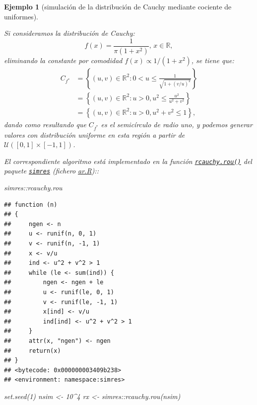 \documentclass[
]{book}
\newenvironment{Shaded}{\begin{snugshade}}{\end{snugshade}}
\newcommand{\DecValTok}[1]{\textcolor[rgb]{0.00,0.00,0.81}{#1}}
\newcommand{\FunctionTok}[1]{\textcolor[rgb]{0.00,0.00,0.00}{#1}}
\newcommand{\NormalTok}[1]{#1}
\newcommand{\OtherTok}[1]{\textcolor[rgb]{0.56,0.35,0.01}{#1}}
\newcommand{\SpecialCharTok}[1]{\textcolor[rgb]{0.00,0.00,0.00}{#1}}
\theoremstyle{break}
\newtheorem{example}{Ejemplo}[chapter]
\theoremstyle{nonumberplain}
\begin{document}
\begin{example}[simulación de la distribución de Cauchy mediante cociente de uniformes]
\protect\hypertarget{exm:cauchy-rou}{}\label{exm:cauchy-rou}

Si consideramos la distribución de Cauchy:
\[f(x) = \frac{1}{\pi (1 + x^2)} \text{, } x\in \mathbb{R},\]
eliminando la constante por comodidad \(f(x) \propto 1/(1 + x^2)\), se tiene que:
\[\begin{aligned}
C_{f^{\ast}} & = \left\{ (u, v) \in \mathbb{R}^{2} : 0 <u \leq \frac{1}{\sqrt{1 + (v/u)^2}}  \right\} \\
& = \left\{ (u, v) \in \mathbb{R}^{2} : u > 0, u^2 \leq \frac{u^2}{u^2 + v^2}  \right\} \\
& = \left\{ (u, v) \in \mathbb{R}^{2} : u > 0, u^2 + v^2 \leq 1  \right\}, 
\end{aligned}\]
dando como resultando que \(C_{f^{\ast}}\) es el semicírculo de radio uno, y podemos generar valores con distribución uniforme en esta región a partir de \(\mathcal{U}\left([0,1]\times[-1,1] \right)\).

El correspondiente algoritmo está implementado en la función \href{https://rubenfcasal.github.io/simres/reference/rcauchy.rou.html}{\texttt{rcauchy.rou()}} del paquete \href{https://rubenfcasal.github.io/simres}{\texttt{simres}} (fichero \href{R/ar.R}{\emph{ar.R}})::

\begin{Shaded}
\begin{Highlighting}[]
\NormalTok{simres}\SpecialCharTok{::}\NormalTok{rcauchy.rou}
\end{Highlighting}
\end{Shaded}

\begin{verbatim}
## function (n) 
## {
##     ngen <- n
##     u <- runif(n, 0, 1)
##     v <- runif(n, -1, 1)
##     x <- v/u
##     ind <- u^2 + v^2 > 1
##     while (le <- sum(ind)) {
##         ngen <- ngen + le
##         u <- runif(le, 0, 1)
##         v <- runif(le, -1, 1)
##         x[ind] <- v/u
##         ind[ind] <- u^2 + v^2 > 1
##     }
##     attr(x, "ngen") <- ngen
##     return(x)
## }
## <bytecode: 0x000000003409b238>
## <environment: namespace:simres>
\end{verbatim}

\begin{Shaded}
\begin{Highlighting}[]
\FunctionTok{set.seed}\NormalTok{(}\DecValTok{1}\NormalTok{)}
\NormalTok{nsim }\OtherTok{\textless{}{-}} \DecValTok{10}\SpecialCharTok{\^{}}\DecValTok{4}
\NormalTok{rx }\OtherTok{\textless{}{-}}\NormalTok{ simres}\SpecialCharTok{::}\FunctionTok{rcauchy.rou}\NormalTok{(nsim)}


\end{Highlighting}
\end{Shaded}
\end{example}
\end{document}
